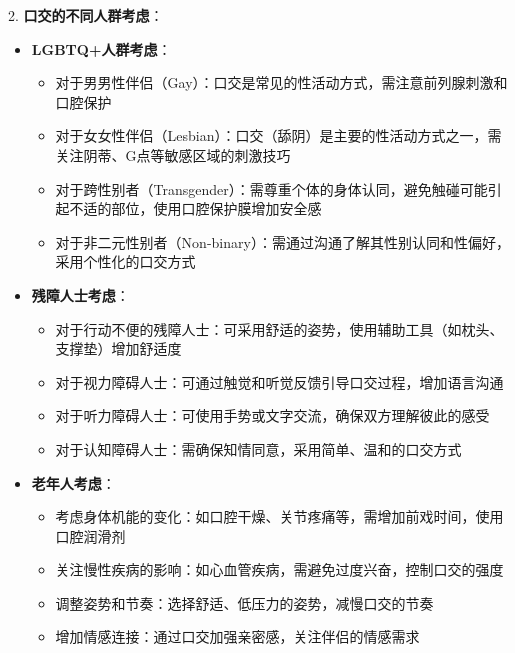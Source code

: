 \documentclass[12pt,UTF8]{ctexbook}
\begin{document}
2. \textbf{口交的不同人群考虑}：
\begin{itemize}
	\item \textbf{LGBTQ+人群考虑}：
	\begin{itemize}
		\item 对于男男性伴侣（Gay）：口交是常见的性活动方式，需注意前列腺刺激和口腔保护
		\item 对于女女性伴侣（Lesbian）：口交（舔阴）是主要的性活动方式之一，需关注阴蒂、G点等敏感区域的刺激技巧
		\item 对于跨性别者（Transgender）：需尊重个体的身体认同，避免触碰可能引起不适的部位，使用口腔保护膜增加安全感
		\item 对于非二元性别者（Non-binary）：需通过沟通了解其性别认同和性偏好，采用个性化的口交方式
	\end{itemize}
	\item \textbf{残障人士考虑}：
	\begin{itemize}
		\item 对于行动不便的残障人士：可采用舒适的姿势，使用辅助工具（如枕头、支撑垫）增加舒适度
		\item 对于视力障碍人士：可通过触觉和听觉反馈引导口交过程，增加语言沟通
		\item 对于听力障碍人士：可使用手势或文字交流，确保双方理解彼此的感受
		\item 对于认知障碍人士：需确保知情同意，采用简单、温和的口交方式
	\end{itemize}
	\item \textbf{老年人考虑}：
	\begin{itemize}
		\item 考虑身体机能的变化：如口腔干燥、关节疼痛等，需增加前戏时间，使用口腔润滑剂
		\item 关注慢性疾病的影响：如心血管疾病，需避免过度兴奋，控制口交的强度
		\item 调整姿势和节奏：选择舒适、低压力的姿势，减慢口交的节奏
		\item 增加情感连接：通过口交加强亲密感，关注伴侣的情感需求
	\end{itemize}
\end{itemize}
\end{document}
